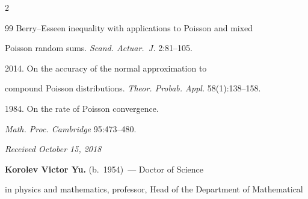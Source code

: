 \begin{multicols}{2}
{{\begin{thebibliography}{99}
Berry--Esseen inequality with applications to Poisson and mixed


Poisson random sums. \textit{Scand. Actuar.~J.} 2:81--105.







 2014. On the accuracy of the normal approximation to


compound Poisson distributions. \textit{Theor. Probab. Appl.} 58(1):138--158.







 1984. On the rate of Poisson convergence.


\textit{Math. Proc. Cambridge} 95:473--480.





\end{thebibliography}





 }


 }





\end{multicols}





\vspace*{-6pt}





\hfill{\small\textit{Received October 15, 2018}}















\Contr





\noindent


\textbf{Korolev Victor Yu.} (b.\ 1954)~--- Doctor of Science 


in physics and mathematics, professor, Head of the Department of Mathematical 


